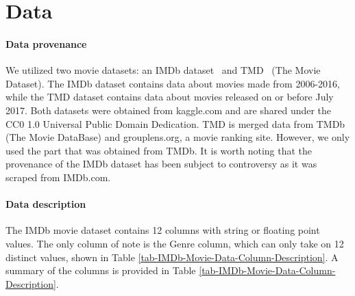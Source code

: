 \section{Data}
    \begin{multicols}{2}
        \paragraph{Data provenance}
            We utilized two movie datasets: an IMDb dataset~\cite{data:IMDb} and
                TMD~\cite{data:TMD} (The Movie Dataset).
            The IMDb dataset contains data about movies made from 2006-2016, while the TMD
                dataset contains data about movies released on or before July 2017.
            Both datasets were obtained from kaggle.com and are shared under the CC0 1.0
                Universal Public Domain Dedication.
            TMD is merged data from TMDb (The Movie DataBase) and grouplens.org, a movie
                ranking site.
            However, we only used the part that was obtained from TMDb.
            It is worth noting that the provenance of the IMDb dataset has been subject to
                controversy as it was scraped from IMDb.com.

        \paragraph{Data description}
            The IMDb movie dataset contains 12 columns with string or floating point
                values.
            The only column of note is the Genre column, which can only take on 12 distinct
                values, shown in Table \ref{tab-IMDb-Movie-Data-Column-Description}.
            A summary of the columns is provided in Table
                \ref{tab-IMDb-Movie-Data-Column-Description}.
    \end{multicols}
